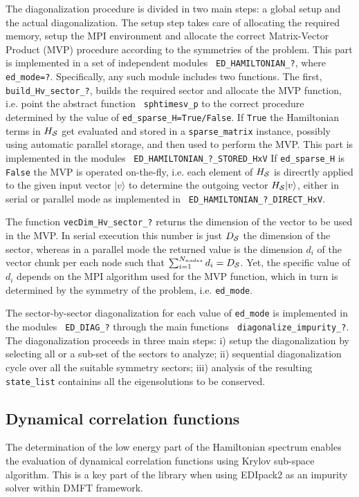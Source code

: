 \documentclass[preprint,3p,10pt]{elsarticle}
\newcommand{\ket}[1]
{|#1\rangle}
\def\NAME{{\rm EDIpack2 }}
\begin{document}
The diagonalization procedure is divided in two main steps: a global
setup and the actual diagonalization.
%
The setup step takes care of allocating the required memory,
setup the MPI environment and allocate the correct 
Matrix-Vector Product (MVP) procedure according to the symmetries of
the problem. 
This part is implemented in a set of independent modules  {\tt
  ED\_HAMILTONIAN\_?}, where {\tt ed\_mode=?}.
Specifically, any such module includes two functions.
The first, {\tt  build\_Hv\_sector\_?}, builds the required sector and
allocate the MVP function, i.e. point the abstract function {\tt
  sphtimesv\_p} to the correct procedure determined by the value of
{\tt ed\_sparse\_H=True/False}.
If {\tt True} the Hamiltonian terms in $H_{\cal S}$
get evaluated and stored in a {\tt sparse\_matrix} instance, possibly
using automatic parallel storage, and then used to perform
the MVP. This part is implemented in the modules {\tt
  ED\_HAMILTONIAN\_?\_STORED\_HxV}
If {\tt ed\_sparse\_H} is {\tt False} the MVP is operated on-the-fly,
i.e. each element of $H_{\cal S}$ is direcrtly applied to the given input
vector $\ket{v}$ to determine the outgoing vector $H_\SS\ket{v}$,
either in serial or parallel mode as implemented in {\tt
  ED\_HAMILTONIAN\_?\_DIRECT\_HxV}.  



The function {\tt vecDim\_Hv\_sector\_?} returns the 
dimension of the vector to be used in the
MVP. In serial execution this number is just $D_{\cal S}$ the dimension of
the sector, whereas in a parallel mode the returned value is the
dimension $d_i$ of the vector chunk per each node such that
$\sum_{i=1}^{N_{nodes}}d_i = D_{\cal S}$. Yet, the specific value of $d_i$
depends on the MPI algorithm used for the MVP function, which in turn
is determined by the symmetry of the problem, i.e. {\tt ed\_mode}.


The sector-by-sector diagonalization for each
value of {\tt ed\_mode} is implemented in the modules {\tt
  ED\_DIAG\_?} through the main functions {\tt
  diagonalize\_impurity\_?}. The diagonalization proceeds in three main
steps: i) setup the diagonalization by selecting all or a sub-set of the
sectors to analyze; ii) sequential diagonalization cycle over all the suitable symmetry
sectors; iii) analysis of the resulting {\tt state\_list} containins
all the eigensolutions to be conserved.




\subsection{Dynamical correlation functions}\label{sSecGF}
The determination of the low energy part of the Hamiltonian spectrum
enables the evaluation of dynamical correlation functions using Krylov
sub-space algorithm.
This is a key part of the library when using \NAME as an impurity
solver within DMFT framework. 
\end{document}
